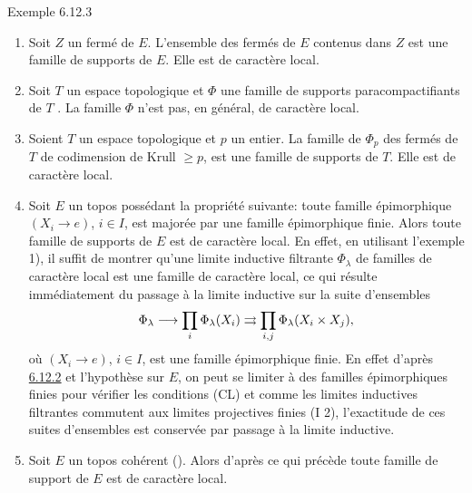 \documentclass[10pt]{../fichiers-configuration-latex/smfart}
\begin{document}
\begin{enonce*}[remark]{Exemple 6.12.3}
\begin{enumerate}
\renewcommand{\labelenumi}{\theenumi)}
\item Soit $Z$ un fermé de $E$. L'ensemble des fermés de $E$
  contenus dans $Z$ est une famille de supports de $E$. Elle est de
  caractère local.

\item Soit $T$ un espace topologique et $\Phi$ une famille de supports
  paracompactifiants de $T$ \cite{SGA4-05:7}. La famille $\Phi$ n'est pas, en
  général, de caractère local.

\item Soient $T$ un espace topologique et $p$ un entier. La famille de
  $\Phi_p$ des fermés de $T$ de codimension de Krull $\geq p$, est
  une famille de supports de $T$. Elle est de caractère local.

\item Soit $E$ un topos possédant la propriété suivante: toute
  famille épimorphique $(X_i \to e)$, $i \in I$, est majorée par
  une famille épimorphique finie. Alors toute famille de supports de
  $E$ est de caractère local. En effet, en utilisant l'exemple 1),
  il suffit de montrer qu'une limite inductive filtrante
  $\Phi_\lambda$ de familles de caractère local est une famille de
  caractère local, ce qui résulte immédiatement du passage à
  la limite inductive sur la suite d'ensembles
$$
\Phi_\lambda \to \prod_i \Phi_{\lambda} (X_i) \rightrightarrows
\prod_{i, j} \Phi_\lambda (X_i \times X_j){\quoi},
$$
où $(X_i \to e)$, $i \in I$, est une famille épimorphique
finie. En effet d'après \hyperref[V.subsubsec6.12.2]{6.12.2} et l'hypothèse sur $E$, on peut se
limiter à  des familles épimorphiques finies pour vérifier les
conditions (CL) et comme les limites inductives filtrantes commutent
aux limites projectives finies (I 2), l'exactitude de ces suites
d'ensembles est conservée par passage à la limite inductive.

\item Soit $E$ un topos cohérent (). Alors d'après ce qui
  précède toute famille de support de $E$ est de caractère
  local.
\end{enumerate}
\end{enonce*}

\setcounter{subsection}{12}
\end{document}
